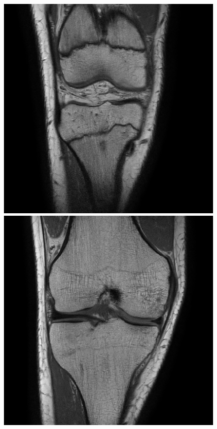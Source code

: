 \begin{figure}[H]
  \includegraphics[width=\linewidth]{imgs/transfer_size_x1.png}
\endminipage\hfill
{}
  \includegraphics[width=\linewidth]{imgs/transfer_size_x2.png}

\end{figure}
